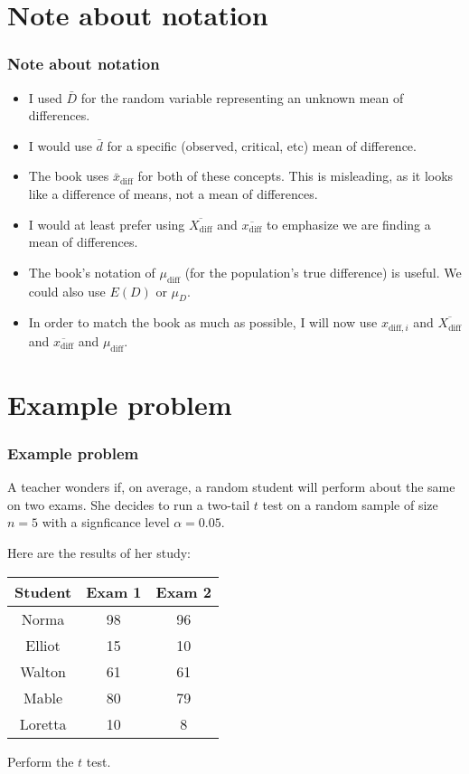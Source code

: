 \documentclass[slidestop,compress,mathserif]{beamer}
\begin{document}
\section{Note about notation}
\begin{frame}
\frametitle{Note about notation}
\begin{itemize}
\item I used $\bar{D}$ for the random variable representing an unknown mean of differences. \pause
\item I would use $\bar{d}$ for a specific (observed, critical, etc) mean of difference. \pause
\item The book uses $\bar{x}_\text{diff}$ for both of these concepts. This is misleading, as it looks like a difference of means, not a mean of differences. \pause
\item I would at least prefer using $\overline{X_\text{diff}}$ and $\overline{x_\text{diff}}$ to emphasize we are finding a mean of differences. \pause
\item The book's notation of $\mu_\text{diff}$ (for the population's true difference) is useful. We could also use $E(D)$ or $\mu_{D}$.
\item In order to match the book as much as possible, I will now use $x_{\text{diff},i}$ and $\overline{X_\text{diff}}$ and $\overline{x_\text{diff}}$ and $\mu_\text{diff}$.
\end{itemize}
\end{frame}

\newcommand{\xdi}{x_{\text{diff},i}}
\newcommand{\bxd}{\overline{x_\text{diff}}}
\newcommand{\bXd}{\overline{X_\text{diff}}}
\newcommand{\mud}{\mu_\text{diff}}

\section{Example problem}
\begin{frame}
\frametitle{Example problem}
A teacher wonders if, on average, a random student will perform about the same on two exams. She decides to run a two-tail $t$ test on a random sample of size $n=5$ with a signficance level $\alpha=0.05$.

\pause

Here are the results of her study:
\begin{center}
\begin{tabular}{|c|c|c|} \hline
Student & Exam 1 & Exam 2 \\ \hline
Norma   & 98     & 96     \\  
Elliot  & 15     & 10     \\  
Walton  & 61     & 61     \\  
Mable   & 80     & 79     \\  
Loretta & 10     & 8      \\  \hline
\end{tabular}
\end{center}
Perform the $t$ test.
\end{frame}
\end{document}

